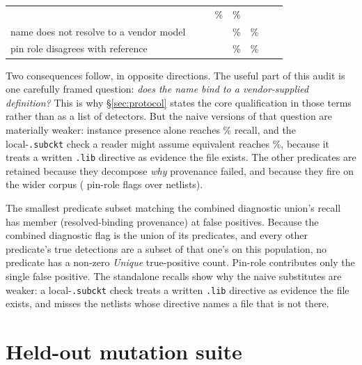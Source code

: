 \begin{table}[t]
\begin{tabular}{@{}lccccccc@{}}
  & \SoloBehavioralStubTP{} & \SoloBehavioralStubFP{}
  & \SoloBehavioralStubPrecision{}\% & \SoloBehavioralStubRecall{}\%
  & \UniqueBehavioralStub{} \\
name does not resolve to a vendor model & \SoloResolvedBindingFlagged{}
  & \SoloResolvedBindingTP{} & \SoloResolvedBindingFP{}
  & \SoloResolvedBindingPrecision{}\% & \SoloResolvedBindingRecall{}\%
  & \UniqueResolvedBinding{} \\
pin role disagrees with reference & \SoloPinRoleMismatchFlagged{}
  & \SoloPinRoleMismatchTP{} & \SoloPinRoleMismatchFP{}
  & \SoloPinRoleMismatchPrecision{}\% & \SoloPinRoleMismatchRecall{}\%
  & \UniquePinRoleMismatch{} \\
\bottomrule
\end{tabular}
\end{table}

Two consequences follow, in opposite directions. The useful part of this audit
is one carefully framed question: \emph{does the name bind to a
vendor-supplied definition?} This is why \S\ref{sec:protocol} states
the core qualification in those terms rather than as a list of detectors. But the naive
versions of that question are materially weaker: instance presence alone
reaches \SoloNoPartRecall{}\% recall, and the local-\texttt{.subckt} check a
reader might assume equivalent reaches \SoloSubstitutedRecall{}\%, because it
treats a written \texttt{.lib} directive as evidence the file exists. The
other predicates are retained because they decompose \emph{why} provenance
failed, and because they fire on the wider corpus (\FlagPinRole{} pin-role
flags over \NumNetlists{} netlists).

The smallest predicate subset matching the combined diagnostic union's recall has
\MinimalSubsetSize{} member (resolved-binding provenance) at
\MinimalSubsetFP{} false positives. Because the combined diagnostic flag is
the union of its predicates, and every other predicate's true detections are a
subset of that one's on this population, no predicate has a non-zero
\emph{Unique} true-positive count. Pin-role contributes only the single false
positive. The
standalone recalls show why the naive substitutes are weaker: a
local-\texttt{.subckt} check treats a written \texttt{.lib} directive as
evidence the file exists, and misses the netlists whose directive names a file
that is not there.

\section{Held-out mutation suite}
\label{app:mutants}

